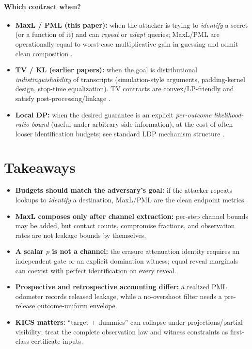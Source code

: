 \documentclass[11pt]{article}
\begin{document}
\paragraph{Which contract when?}
\begin{itemize}
\item \textbf{MaxL / PML (this paper):} when the attacker is trying to \emph{identify} a secret (or a function of it) and can \emph{repeat} or \emph{adapt} queries; MaxL/PML are operationally equal to worst-case multiplicative gain in guessing and admit clean composition \cite{issa2020operational,saeidian2023pml}.
\item \textbf{TV / KL (earlier papers):} when the goal is distributional \emph{indistinguishability} of transcripts (simulation-style arguments, padding-kernel design, stop-time equalization). TV contracts are convex/LP-friendly and satisfy post-processing/linkage \cite{rassouli2018tv}.
\item \textbf{Local DP:} when the desired guarantee is an explicit \emph{per-outcome likelihood-ratio bound} (useful under arbitrary side information), at the cost of often looser identification budgets; see standard LDP mechanism structure \cite{duchi2013localprivacy,kairouz2016ldp}.
\end{itemize}

\section{Takeaways}
\begin{itemize}
\item \textbf{Budgets should match the adversary's goal:} if the attacker repeats lookups to \emph{identify} a destination, MaxL/PML are the clean endpoint metrics.
\item \textbf{MaxL composes only after channel extraction:} per-step channel bounds may be added, but contact counts, compromise fractions, and observation rates are not leakage bounds by themselves.
\item \textbf{A scalar $p$ is not a channel:} the erasure attenuation identity requires an independent gate or an explicit domination witness; equal reveal marginals can coexist with perfect identification on every reveal.
\item \textbf{Prospective and retrospective accounting differ:} a realized PML odometer records released leakage, while a no-overshoot filter needs a pre-release outcome-uniform envelope.
\item \textbf{KICS matters:} ``target + dummies'' can collapse under projections/partial visibility; treat the complete observation law and witness constraints as first-class certificate inputs.
\end{itemize}
\end{document}
